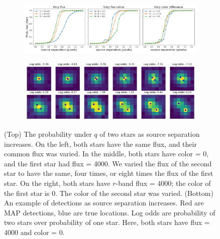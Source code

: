 \begin{figure}[!h]
    \centering
    \begin{subfigure}{0.95\textwidth}
        \includegraphics[width=\textwidth]{figures/deblending_test.png}
    \end{subfigure}
      \begin{subfigure}{0.95\textwidth}
        \includegraphics[width=\textwidth]{figures/deblending_ex_test.png}
    \end{subfigure}
    \label{eq:deblending_test}
    \caption{(Top) The probability under $q$ of two stars as source separation increases. On the left, both stars have the same flux, and their common flux was varied. In the middle, both stars have color = 0, and the first star had flux = 4000. We varied the flux of the second star to have the same, four times, or eight times the flux of the first star. On the right, both stars have $r$-band flux = 4000; the color of the first star is 0. The color of the second star was varied.
    (Bottom) An example of detections as source separation increases. Red are MAP detections, blue are true locations. Log odds are probability of two stars over probability of one star. Here, both stars have flux = 4000 and color = 0.}
    \label{fig:sparse_field}
\end{figure}
